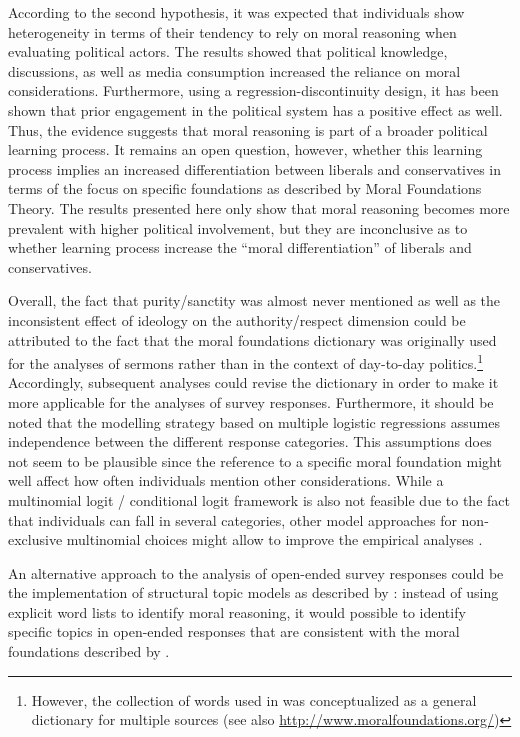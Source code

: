 \documentclass[12pt]{article}
\begin{document}

According to the second hypothesis, it was expected that individuals show heterogeneity in terms of their tendency to rely on moral reasoning when evaluating political actors. The results showed that political knowledge, discussions, as well as media consumption increased the reliance on moral considerations. Furthermore, using a regression-discontinuity design, it has been shown that prior engagement in the political system has a positive effect as well. Thus, the evidence suggests that moral reasoning is part of a broader political learning process. It remains an open question, however, whether this learning process implies an increased differentiation between liberals and conservatives in terms of the focus on specific foundations as described by Moral Foundations Theory. The results presented here only show that moral reasoning becomes more prevalent with higher political involvement, but they are inconclusive as to whether learning process increase the ``moral differentiation'' of liberals and conservatives.

Overall, the fact that purity/sanctity was almost never mentioned as well as the inconsistent effect of ideology on the authority/respect dimension could be attributed to the fact that the moral foundations dictionary was originally used for the analyses of sermons rather than in the context of day-to-day politics.\footnote{However, the collection of words used in \citet{graham2009liberals} was conceptualized as a general dictionary for multiple sources (see also \url{http://www.moralfoundations.org/})} Accordingly, subsequent analyses could revise the dictionary in order to make it more applicable for the analyses of survey responses. Furthermore, it should be noted that the modelling strategy based on multiple logistic regressions assumes independence between the different response categories. This assumptions does not seem to be plausible since the reference to a specific moral foundation might well affect how often individuals mention other considerations. While a multinomial logit / conditional logit framework is also not feasible due to the fact that individuals can fall in several categories, other model approaches for non-exclusive multinomial choices might allow to improve the empirical analyses \citep[see for example][]{gilbert2007models}.

An alternative approach to the analysis of open-ended survey responses could be the implementation of structural topic models as described by \citet{roberts2014structural}: instead of using explicit word lists to identify moral reasoning, it would possible to identify specific topics in open-ended responses that are consistent with the moral foundations described by \citet{haidt2008moral} \citep[see also][]{lin2008joint}.
\end{document}
